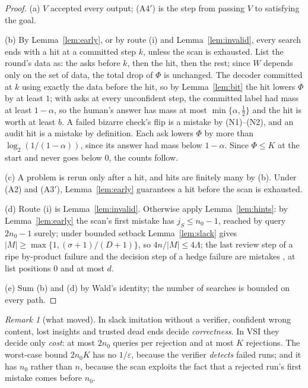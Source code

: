 \documentclass[11pt]{article}
\theoremstyle{definition}
\theoremstyle{remark}
\newtheorem{remark}[theorem]{Remark}
\newcommand{\K}{K}
\begin{document}
\begin{proof}
(a) $V$ accepted every output; (A4$'$) is the step from passing $V$ to satisfying the goal.

(b) By Lemma~\ref{lem:early}, or by route (i) and Lemma~\ref{lem:invalid}, every search ends with a hit at a committed step $k$, unless the scan is exhausted. List the round's data as: the asks before $k$, then the hit, then the rest; since $W$ depends only on the set of data, the total drop of $\Phi$ is unchanged. The decoder committed at $k$ using exactly the data before the hit, so by Lemma~\ref{lem:bit} the hit lowers $\Phi$ by at least $1$; with asks at every unconfident step, the committed label had mass at least $1-\alpha$, so the human's answer has mass at most $\min\{\alpha,\frac12\}$ and the hit is worth at least $b$. A failed bizarre check's flip is a mistake by (N1)--(N2), and an audit hit is a mistake by definition. Each ask lowers $\Phi$ by more than $\log_2(1/(1-\alpha))$, since its answer had mass below $1-\alpha$. Since $\Phi\le\K$ at the start and never goes below $0$, the counts follow.

(c) A problem is rerun only after a hit, and hits are finitely many by (b). Under (A2) and (A3$'$), Lemma~\ref{lem:early} guarantees a hit before the scan is exhausted.

(d) Route (i) is Lemma~\ref{lem:invalid}. Otherwise apply Lemma~\ref{lem:hints}: by Lemma~\ref{lem:early} the scan's first mistake has $j_S\le n_0-1$, reached by query $2n_0-1$ surely; under bounded setback Lemma~\ref{lem:slack} gives $|M|\ge\max\{1,(\sigma+1)/(D+1)\}$, so $4n/|M|\le4\Lambda$; the last review step of a ripe by-product failure and the decision step of a hedge failure are mistakes \cite{threadG}, at list positions $0$ and at most $d$.

(e) Sum (b) and (d) by Wald's identity; the number of searches is bounded on every path.
\end{proof}

\begin{remark}[what moved]
In slack imitation without a verifier, confident wrong content, lost insights and trusted dead ends decide \emph{correctness}. In VSI they decide only \emph{cost}: at most $2n_0$ queries per rejection and at most $\K$ rejections. The worst-case bound $2n_0\K$ has no $1/\varepsilon$, because the verifier \emph{detects} failed runs; and it has $n_0$ rather than $n$, because the scan exploits the fact that a rejected run's first mistake comes before $n_0$.
\end{remark}
\end{document}
